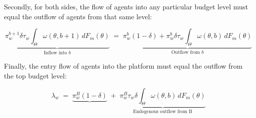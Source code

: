 Secondly, for both sides, the flow of agents into any particular budget level must equal the outflow of agents from that same level: 

\begin{equation}
    \underbrace{\pi_w^{b+1} \delta \tau_w \int_{\Theta} \omega(\theta,b+1)\,dF_{m}(\theta)}_{\text{Inflow into $b$}} \;=\; \underbrace{\pi_w^{b} (1-\delta) + \pi_w^{b} \delta \tau_w\int_{\Theta} \omega(\theta,b)\,dF_{m}(\theta)}_{\text{Outflow from $b$}}
\end{equation}

Finally, the entry flow of agents into the platform must equal the outflow from the top budget level:

\begin{equation}
    \lambda_w \;=\; \underbrace{\pi_w^{B}(1-\delta)} \;+\; \underbrace{\pi_w^{B} \tau_w \delta \int_{\Theta} \omega(\theta,b)\,dF_{m}(\theta)}_{\text{Endogenous outflow from B}}
\end{equation}

%  


\begin{comment}
\begin{equation} 
    \underbrace{\lambda_m \Big( F_m(\theta'')-F_m(\theta') \Big)}_{\text{Entering Agents}}\;=\;\underbrace{(1-\delta)N^m(\sigma)}_{\text{Exogenous Deaths}}+\quad  \underbrace{\delta N^m(\sigma)  G^m_b(1 \,|\, \sigma)\int_{\Theta}\sigma_m(\theta,1)\,dG^w_\theta(\theta \,|\, \sigma)}_{\text{Expended Budgets}} 
\end{equation} 

\begin{equation}
    \underbrace{\left(\delta  \int_{\Theta}\sigma_m(\theta,b+1)\,dw_\theta(\theta \,|\, \sigma)\right)N_mR^m_{b+1}}_{\text{Transitions into budget b}}\;=\;\underbrace{\left((1-\delta)+\delta \int_{\Theta} \sigma_m(\theta,b)\,dw_\theta(\theta \,|\, \sigma)\right)N^m R^m_{b}}_{\text{Transitions out of budget b}}
\end{equation}

\begin{equation}
    \underbrace{\lambda_m \Big(F_m(\theta'')-F_m(\theta')\Big)}_{\text{Transitions into budget level B}}\;=\;\underbrace{\left((1-\delta)+\delta \int_{\Theta} \mu(\theta,b)\,dw_\theta(\theta \,|\, \sigma)\right)N_mR^m_{B}}_{\text{Transitions out of budget level B}}
\end{equation} 
\end{comment} 


